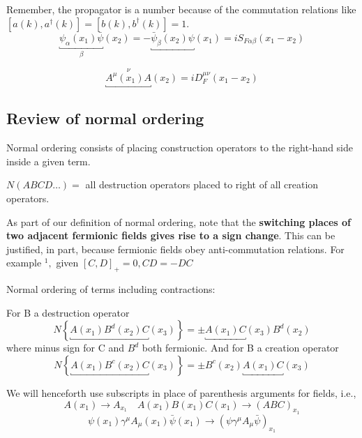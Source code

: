 Remember, the propagator is a number because of the commutation relations like $[a(k),a^{\dagger}(k)]=[b(k),b^{\dagger}(k)]=1$.
\begin{equation}
    \underbracket{\psi_{\alpha}\left(x_{1}\right) \bar{\psi}}_{\beta}\left(x_{2}\right)=-\underbracket{\bar{\psi}_{\beta}\left(x_{2}\right) \psi}_{ }\left(x_{1}\right)=i S_{F \alpha \beta}\left(x_{1}-x_{2}\right)
    \label{contraction-spinor-field}
\end{equation}

\begin{equation}
    \underbracket{A^{\mu}\left(x_{1}\right) A}^{\nu}\left(x_{2}\right)=i D_{F}^{\mu \nu}\left(x_{1}-x_{2}\right)
    \label{contraction-em-field}
\end{equation}

\subsection{Review of normal ordering}
Normal ordering consists of placing construction operators to the right-hand side inside a given term.
\begin{center}
    $N(A B C D \ldots)=$ all destruction operators placed to right of all creation operators.
\end{center}
As part of our definition of normal ordering, note that the \textbf{switching places of two adjacent fermionic fields gives rise to a sign change}. This can be justified, in part, because fermionic fields obey anti-commutation relations. For example $^{1},$ given $[C, D]_{+}=0, C D=-D C$
\begin{qt}
Normal ordering of terms including contractions:

For B a destruction operator
\begin{equation}
N\left\{\underbracket{A\left(x_{1}\right) B^{d}\left(x_{2}\right) C}\left(x_{3}\right)\right\}=\pm \underbracket{A\left(x_{1}\right) C}\left(x_{3}\right) B^{d}\left(x_{2}\right)
\end{equation}
where minus sign for C and $B^{d}$ both fermionic. And for B a creation operator
\begin{equation}
N\left\{\underbracket{A\left(x_{1}\right) B^{c}\left(x_{2}\right) C}\left(x_{3}\right)\right\}=\pm B^{c}\left(x_{2}\right) \underbracket{A\left(x_{1}\right) C}\left(x_{3}\right)
\end{equation}
\end{qt}
\begin{mybox}
We will henceforth use subscripts in place of parenthesis arguments for fields, i.e.,
$$
A\left(x_{1}\right) \rightarrow A_{x_{1}} \quad A\left(x_{1}\right) B\left(x_{1}\right) C\left(x_{1}\right) \rightarrow(A B C)_{x_{1}}
$$
$$
\psi\left(x_{1}\right) \gamma^{\mu} A_{\mu}\left(x_{1}\right) \bar{\psi}\left(x_{1}\right) \rightarrow\left(\psi \gamma^{\mu} A_{\mu} \bar{\psi}\right)_{x_{1}}
$$
\end{mybox}
